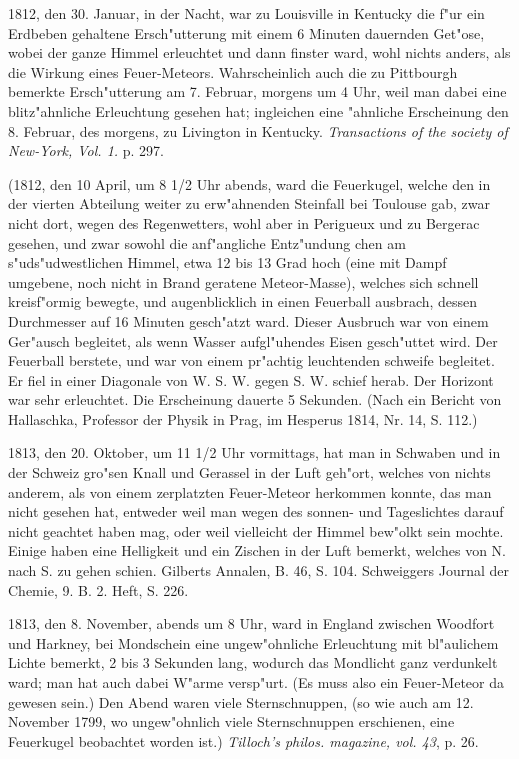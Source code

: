 \documentclass[a4paper, 11pt, oneside, polutonikogreek, german]{article}
\begin{document}
1812, den 30. Januar, in der Nacht, war zu Louisville in Kentucky die f"ur ein Erdbeben gehaltene Ersch"utterung mit einem 6 Minuten dauernden Get"ose, wobei der ganze Himmel erleuchtet und dann finster ward, wohl nichts anders, als die Wirkung eines Feuer-Meteors. Wahrscheinlich auch die zu Pittbourgh bemerkte Ersch"utterung am 7. Februar, morgens um 4 Uhr, weil man dabei eine blitz"ahnliche Erleuchtung gesehen hat; ingleichen eine "ahnliche Erscheinung den 8. Februar, des morgens, zu Livington in Kentucky. \emph{Transactions of the society of New-York, Vol. 1.} p. 297.

(1812, den 10 April, um 8 1/2 Uhr abends, ward die Feuerkugel, welche den in der vierten Abteilung weiter zu erw"ahnenden Steinfall bei Toulouse gab, zwar nicht dort, wegen des Regenwetters, wohl aber in Perigueux und zu Bergerac gesehen, und zwar sowohl die anf"angliche Entz"undung chen am s"uds"udwestlichen Himmel, etwa 12 bis 13 Grad hoch (eine mit Dampf umgebene, noch nicht in Brand geratene Meteor-Masse), welches sich schnell kreisf"ormig bewegte, und augenblicklich in einen Feuerball ausbrach, dessen Durchmesser auf 16 Minuten gesch"atzt ward. Dieser Ausbruch war von einem Ger"ausch begleitet, als wenn Wasser aufgl"uhendes Eisen gesch"uttet wird. Der Feuerball berstete, und war von einem pr"achtig leuchtenden schweife begleitet. Er fiel in einer Diagonale von W. S. W. gegen S. W. schief herab. Der Horizont war sehr erleuchtet. Die Erscheinung dauerte 5 Sekunden. (Nach ein Bericht von Hallaschka, Professor der Physik in Prag, im Hesperus 1814, Nr. 14, S. 112.)

1813, den 20. Oktober, um 11 1/2 Uhr vormittags, hat man in Schwaben und in der Schweiz gro"sen Knall und Gerassel in der Luft geh"ort, welches von nichts anderem, als von einem zerplatzten Feuer-Meteor herkommen konnte, das man nicht gesehen hat, entweder weil man wegen des sonnen- und Tageslichtes darauf nicht geachtet haben mag, oder weil vielleicht der Himmel bew"olkt sein mochte. Einige haben eine Helligkeit und ein Zischen in der Luft bemerkt, welches von N. nach S. zu gehen schien. Gilberts Annalen, B. 46, S. 104. Schweiggers Journal der Chemie, 9. B. 2. Heft, S. 226.

1813, den 8. November, abends um 8 Uhr, ward in England zwischen Woodfort und Harkney, bei Mondschein eine ungew"ohnliche Erleuchtung mit bl"aulichem Lichte bemerkt, 2 bis 3 Sekunden lang, wodurch das Mondlicht ganz verdunkelt ward; man hat auch dabei W"arme versp"urt. (Es muss also ein Feuer-Meteor da gewesen sein.) Den Abend waren viele Sternschnuppen, (so wie auch am 12. November 1799, wo ungew"ohnlich viele Sternschnuppen erschienen, eine Feuerkugel beobachtet worden ist.) \emph{Tilloch's philos. magazine, vol. 43}, p. 26.
\end{document}
